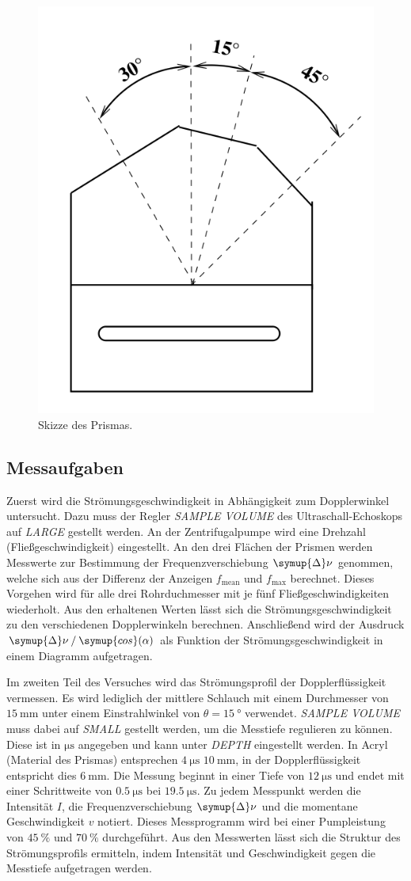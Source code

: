 \begin{figure}
    \centering
    \includegraphics[width=.2\textwidth]{content/Prisma.png}
    \caption{Skizze des Prismas.}
    \label{fig:Prisma}
\end{figure}  

\subsection{Messaufgaben}
\label{subsec:Messaufgaben}
Zuerst wird die Strömungsgeschwindigkeit in Abhängigkeit zum Dopplerwinkel untersucht. Dazu muss der Regler \textit{SAMPLE VOLUME} des Ultraschall-Echoskops auf \textit{LARGE}
gestellt werden. An der Zentrifugalpumpe wird eine Drehzahl (Fließgeschwindigkeit) eingestellt. An den drei Flächen der Prismen werden Messwerte zur Bestimmung der 
Frequenzverschiebung $\symup{\Delta}\nu$ genommen, welche sich aus der Differenz der Anzeigen $f_\text{mean}$ und $f_\text{max}$ berechnet. Dieses Vorgehen wird für alle 
drei Rohrduchmesser mit je fünf Fließgeschwindigkeiten wiederholt. Aus den erhaltenen Werten lässt sich die Strömungsgeschwindigkeit zu den verschiedenen Dopplerwinkeln
berechnen. Anschließend wird der Ausdruck $\symup{\Delta}\nu \mathbin{/} \symup{cos}(\alpha)$ als Funktion der Strömungsgeschwindigkeit in einem Diagramm aufgetragen.
 
Im zweiten Teil des Versuches wird das Strömungsprofil der Dopplerflüssigkeit vermessen. Es wird lediglich der mittlere Schlauch mit einem Durchmesser von 
$\qty{15}{\milli\metre}$ unter einem Einstrahlwinkel von $\theta = \qty{15}{\degree}$ verwendet. \textit{SAMPLE VOLUME} muss dabei auf \textit{SMALL} gestellt werden,
um die Messtiefe regulieren zu können. Diese ist in $\unit{\micro\second}$ angegeben und kann unter \textit{DEPTH} eingestellt werden. In Acryl (Material des Prismas) 
entsprechen $\qty{4}{\micro\second}$ $\qty{10}{\milli\metre}$, in der Dopplerflüssigkeit entspricht dies $\qty{6}{\milli\metre}$. Die Messung beginnt in einer Tiefe
von $\qty{12}{\micro\second}$ und endet mit einer Schrittweite von $\qty{0.5}{\micro\second}$ bei $\qty{19.5}{\micro\second}$. Zu jedem Messpunkt werden die 
Intensität $I$, die Frequenzverschiebung $\symup{\Delta}\nu$ und die momentane Geschwindigkeit $v$ notiert. 
Dieses Messprogramm wird bei einer Pumpleistung von $\qty{45}{\percent}$ und $\qty{70}{\percent}$ durchgeführt.
Aus den Messwerten lässt sich die Struktur des Strömungsprofils ermitteln, indem Intensität und Geschwindigkeit gegen die Messtiefe aufgetragen werden.
